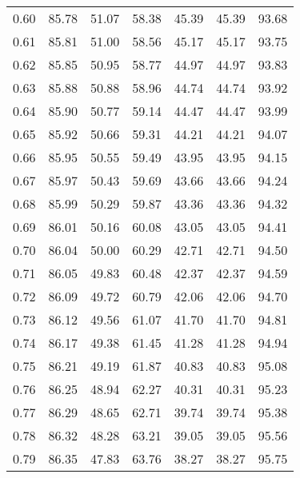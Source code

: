 \begin{tabular}{|c|c|c|c|c|c|c|}
      0.60 &     85.78 &     51.07 &      58.38 &   45.39 &      45.39 &         93.68 \\
      0.61 &     85.81 &     51.00 &      58.56 &   45.17 &      45.17 &         93.75 \\
      0.62 &     85.85 &     50.95 &      58.77 &   44.97 &      44.97 &         93.83 \\
      0.63 &     85.88 &     50.88 &      58.96 &   44.74 &      44.74 &         93.92 \\
      0.64 &     85.90 &     50.77 &      59.14 &   44.47 &      44.47 &         93.99 \\
      0.65 &     85.92 &     50.66 &      59.31 &   44.21 &      44.21 &         94.07 \\
      0.66 &     85.95 &     50.55 &      59.49 &   43.95 &      43.95 &         94.15 \\
      0.67 &     85.97 &     50.43 &      59.69 &   43.66 &      43.66 &         94.24 \\
      0.68 &     85.99 &     50.29 &      59.87 &   43.36 &      43.36 &         94.32 \\
      0.69 &     86.01 &     50.16 &      60.08 &   43.05 &      43.05 &         94.41 \\
      0.70 &     86.04 &     50.00 &      60.29 &   42.71 &      42.71 &         94.50 \\
      0.71 &     86.05 &     49.83 &      60.48 &   42.37 &      42.37 &         94.59 \\
      0.72 &     86.09 &     49.72 &      60.79 &   42.06 &      42.06 &         94.70 \\
      0.73 &     86.12 &     49.56 &      61.07 &   41.70 &      41.70 &         94.81 \\
      0.74 &     86.17 &     49.38 &      61.45 &   41.28 &      41.28 &         94.94 \\
      0.75 &     86.21 &     49.19 &      61.87 &   40.83 &      40.83 &         95.08 \\
      0.76 &     86.25 &     48.94 &      62.27 &   40.31 &      40.31 &         95.23 \\
      0.77 &     86.29 &     48.65 &      62.71 &   39.74 &      39.74 &         95.38 \\
      0.78 &     86.32 &     48.28 &      63.21 &   39.05 &      39.05 &         95.56 \\
      0.79 &     86.35 &     47.83 &      63.76 &   38.27 &      38.27 &         95.75 \\

\end{tabular}
